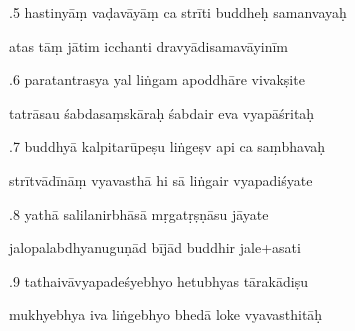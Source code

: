 \documentclass[article,12pt,a4paper]{memoir}%
\newcounter{parCount}
\begin{document}
	  
	  \pstart {}.5 hastinyāṃ vaḍavāyāṃ ca strīti buddheḥ samanvayaḥ 
	{}
	\pend%
      

	  
	  \pstart \leavevmode%
	atas tāṃ jātim icchanti dravyādisamavāyinīm 
	{}
	\pend%
      

	  
	  \pstart {}.6 paratantrasya yal liṅgam apoddhāre vivakṣite 
	{}
	\pend%
      

	  
	  \pstart \leavevmode%
	tatrāsau śabdasaṃskāraḥ śabdair eva vyapāśritaḥ 
	{}
	\pend%
      

	  
	  \pstart {}.7 buddhyā kalpitarūpeṣu liṅgeṣv api ca saṃbhavaḥ 
	{}
	\pend%
      

	  
	  \pstart \leavevmode%
	strītvādīnāṃ vyavasthā hi sā liṅgair vyapadiśyate 
	{}
	\pend%
      

	  
	  \pstart {}.8 yathā salilanirbhāsā mṛgatṛṣṇāsu jāyate 
	{}
	\pend%
      

	  
	  \pstart \leavevmode%
	jalopalabdhyanuguṇād bījād buddhir jale+asati 
	{}
	\pend%
      

	  
	  \pstart {}.9 tathaivāvyapadeśyebhyo hetubhyas tārakādiṣu 
	{}
	\pend%
      

	  
	  \pstart \leavevmode%
	mukhyebhya iva liṅgebhyo bhedā loke vyavasthitāḥ 
	{}
	\pend%
      
\end{document}
